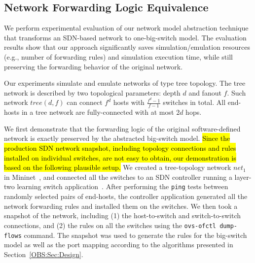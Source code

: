\subsection{Network Forwarding Logic Equivalence}
\label{OBS:SubSec:PreserveForwardingLogic}
We perform experimental evaluation of our network model abstraction technique
that transforms an SDN-based network to one-big-switch model.
The evaluation results show that our approach significantly saves simulation/emulation resources
(e.g., number of forwarding rules) and simulation execution time,
while still preserving the forwarding behavior of the original network.

Our experiments simulate and emulate networks of type tree topology.
The tree network is described by two topological parameters: depth $d$ and fanout $f$.
Such network $tree(d, f)$ can connect $f^d$ hosts with $\frac{f^d - 1}{f-1}$ switches in total.
All end-hosts in a tree network are fully-connected with at most $2d$ hops.


We first demonstrate that the forwarding logic of the original software-defined network is exactly preserved by the abstracted big-switch model.
\hl{
    Since the production SDN network snapshot, including topology connections and rules installed on
individual switches, are not easy to obtain, our demonstration is based on the following plausible setup.
}
\fi
We created a tree-topology network $net_1$ in Mininet~\cite{Mininet},
and connected all the switches to an SDN controller running a layer-two learning switch application~\cite{Pox}.
After performing the \texttt{ping} tests between randomly selected pairs of end-hosts,
the controller application generated all the network forwarding rules and installed them on the switches.
We then took a snapshot of the network, including (1) the host-to-switch and switch-to-switch connections,
and (2) the rules on all the switches using the \texttt{ovs-ofctl dump-flows} command. The snapshot was used to generate the rules for the big-switch model as well as the port mapping according to the algorithms presented in Section~\ref{OBS:Sec:Design}.

